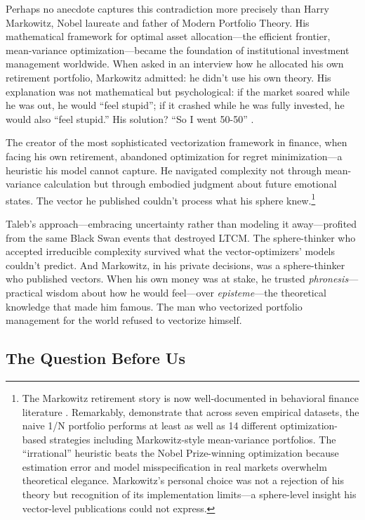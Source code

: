 Perhaps no anecdote captures this contradiction more precisely than Harry Markowitz, Nobel laureate and father of Modern Portfolio Theory. His mathematical framework for optimal asset allocation---the efficient frontier, mean-variance optimization---became the foundation of institutional investment management worldwide. When asked in an interview how he allocated his own retirement portfolio, Markowitz admitted: he didn't use his own theory. His explanation was not mathematical but psychological: if the market soared while he was out, he would ``feel stupid''; if it crashed while he was fully invested, he would also ``feel stupid.'' His solution? ``So I went 50-50'' \citep{gigerenzer2014, collins2022}.

The creator of the most sophisticated vectorization framework in finance, when facing his own retirement, abandoned optimization for regret minimization---a heuristic his model cannot capture. He navigated complexity not through mean-variance calculation but through embodied judgment about future emotional states. The vector he published couldn't process what his sphere knew.\footnote{The Markowitz retirement story is now well-documented in behavioral finance literature \citep{gigerenzer2014, faber2022}. Remarkably, \citet{demiguel2009} demonstrate that across seven empirical datasets, the naive 1/N portfolio performs at least as well as 14 different optimization-based strategies including Markowitz-style mean-variance portfolios. The ``irrational'' heuristic beats the Nobel Prize-winning optimization because estimation error and model misspecification in real markets overwhelm theoretical elegance. Markowitz's personal choice was not a rejection of his theory but recognition of its implementation limits---a sphere-level insight his vector-level publications could not express.}

Taleb's approach---embracing uncertainty rather than modeling it away---profited from the same Black Swan events that destroyed LTCM. The sphere-thinker who accepted irreducible complexity survived what the vector-optimizers' models couldn't predict. And Markowitz, in his private decisions, was a sphere-thinker who published vectors. When his own money was at stake, he trusted \emph{phronesis}---practical wisdom about how he would feel---over \emph{episteme}---the theoretical knowledge that made him famous. The man who vectorized portfolio management for the world refused to vectorize himself.

\subsection{The Question Before Us}

